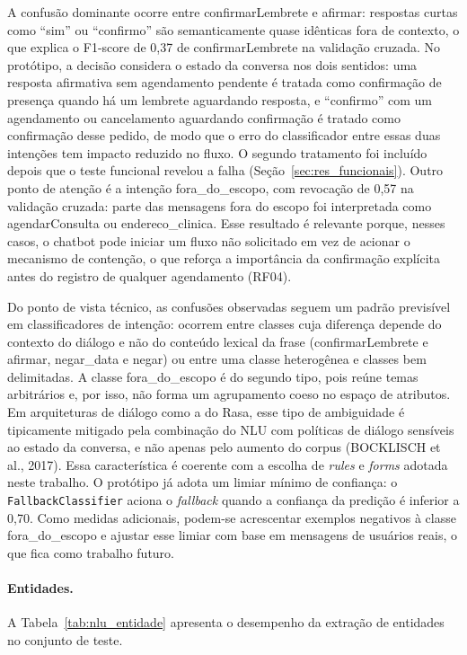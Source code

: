 \documentclass[12pt,a4paper]{extarticle}
\begin{document}
A confusão dominante ocorre entre confirmarLembrete e afirmar: respostas curtas como ``sim'' ou ``confirmo'' são semanticamente quase idênticas fora de contexto, o que explica o F1-score de 0,37 de confirmarLembrete na validação cruzada. No protótipo, a decisão considera o estado da conversa nos dois sentidos: uma resposta afirmativa sem agendamento pendente é tratada como confirmação de presença quando há um lembrete aguardando resposta, e ``confirmo'' com um agendamento ou cancelamento aguardando confirmação é tratado como confirmação desse pedido, de modo que o erro do classificador entre essas duas intenções tem impacto reduzido no fluxo. O segundo tratamento foi incluído depois que o teste funcional revelou a falha (Seção~\ref{sec:res_funcionais}). Outro ponto de atenção é a intenção fora\_\allowbreak{}do\_\allowbreak{}escopo, com revocação de 0,57 na validação cruzada: parte das mensagens fora do escopo foi interpretada como agendarConsulta ou endereco\_\allowbreak{}clinica. Esse resultado é relevante porque, nesses casos, o chatbot pode iniciar um fluxo não solicitado em vez de acionar o mecanismo de contenção, o que reforça a importância da confirmação explícita antes do registro de qualquer agendamento (RF04).

Do ponto de vista técnico, as confusões observadas seguem um padrão previsível em classificadores de intenção: ocorrem entre classes cuja diferença depende do contexto do diálogo e não do conteúdo lexical da frase (confirmarLembrete e afirmar, negar\_\allowbreak{}data e negar) ou entre uma classe heterogênea e classes bem delimitadas. A classe fora\_\allowbreak{}do\_\allowbreak{}escopo é do segundo tipo, pois reúne temas arbitrários e, por isso, não forma um agrupamento coeso no espaço de atributos. Em arquiteturas de diálogo como a do Rasa, esse tipo de ambiguidade é tipicamente mitigado pela combinação do NLU com políticas de diálogo sensíveis ao estado da conversa, e não apenas pelo aumento do corpus (BOCKLISCH et al., 2017). Essa característica é coerente com a escolha de \textit{rules} e \textit{forms} adotada neste trabalho. O protótipo já adota um limiar mínimo de confiança: o \texttt{FallbackClassifier} aciona o \textit{fallback} quando a confiança da predição é inferior a 0,70. Como medidas adicionais, podem-se acrescentar exemplos negativos à classe fora\_\allowbreak{}do\_\allowbreak{}escopo e ajustar esse limiar com base em mensagens de usuários reais, o que fica como trabalho futuro.

\paragraph{Entidades.}
A Tabela~\ref{tab:nlu_entidade} apresenta o desempenho da extração de entidades no conjunto de teste.
\end{document}
